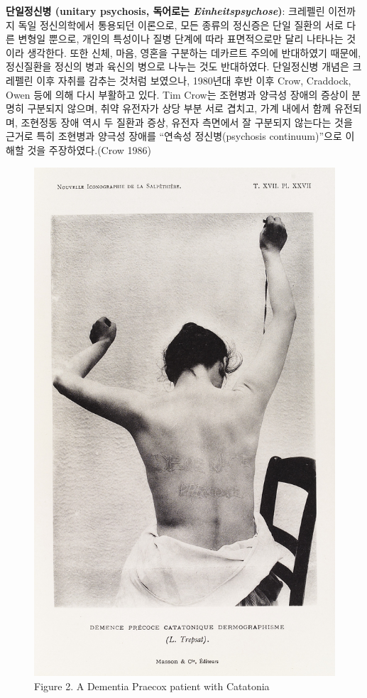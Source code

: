 \documentclass[
]{article}
\begin{document}
\textbf{단일정신병 (unitary psychosis, 독어로는
\emph{Einheitspsychose})}: 크레펠린 이전까지 독일 정신의학에서 통용되던
이론으로, 모든 종류의 정신증은 단일 질환의 서로 다른 변형일 뿐으로,
개인의 특성이나 질병 단계에 따라 표면적으로만 달리 나타나는 것이라
생각한다. 또한 신체, 마음, 영혼을 구분하는 데카르트 주의에 반대하였기
때문에, 정신질환을 정신의 병과 육신의 병으로 나누는 것도 반대하였다.
단일정신병 개념은 크레펠린 이후 자취를 감추는 것처럼 보였으나, 1980년대
후반 이후 Crow, Craddock, Owen 등에 의해 다시 부활하고 있다. Tim Crow는
조현병과 양극성 장애의 증상이 분명히 구분되지 않으며, 취약 유전자가 상당
부분 서로 겹치고, 가계 내에서 함께 유전되며, 조현정동 장애 역시 두
질환과 증상, 유전자 측면에서 잘 구분되지 않는다는 것을 근거로 특히
조현병과 양극성 장애를 ``연속성 정신병(psychosis continuum)''으로 이해할
것을 주장하였다.(Crow 1986)

\begin{figure}
\hypertarget{fig:praecox}{%
\centering
\includegraphics{images/01-01/img_1.png}
\caption{Figure 2. A Dementia Praecox patient with
Catatonia}\label{fig:praecox}
}
\end{figure}
\end{document}
